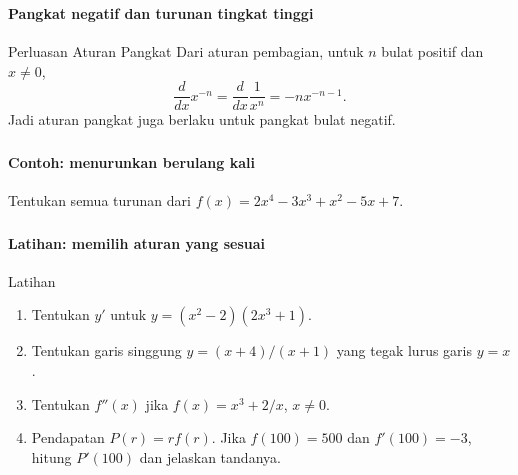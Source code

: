 \documentclass{../../kalkulus-ppt}
\begin{document}
\begin{frame}
\frametitle{\insertsection}
\framesubtitle{Pangkat negatif dan turunan tingkat tinggi}

\begin{block}{Perluasan Aturan Pangkat}
Dari aturan pembagian, untuk $n$ bulat positif dan $x\ne0$,
\[\frac{d}{dx}x^{-n}=\frac{d}{dx}\frac1{x^n}=-nx^{-n-1}.\]
Jadi aturan pangkat juga berlaku untuk pangkat bulat negatif.
\end{block}
\end{frame}


\begin{frame}
\frametitle{\insertsection}
\framesubtitle{Contoh: menurunkan berulang kali}

\begin{contoh}
Tentukan semua turunan dari $f(x)=2x^4-3x^3+x^2-5x+7$.
\end{contoh}
\end{frame}


\begin{frame}
\frametitle{\insertsection}
\framesubtitle{Latihan: memilih aturan yang sesuai}

\begin{exampleblock}{Latihan}
\begin{enumerate}
\item Tentukan $y'$ untuk $y=(x^2-2)(2x^3+1)$.
\item Tentukan garis singgung $y=(x+4)/(x+1)$ yang tegak lurus garis $y=x$.
\item Tentukan $f''(x)$ jika $f(x)=x^3+2/x$, $x\ne0$.
\item Pendapatan $P(r)=rf(r)$. Jika $f(100)=500$ dan $f'(100)=-3$, hitung $P'(100)$ dan jelaskan tandanya.
\end{enumerate}
\end{exampleblock}
\end{frame}
\end{document}
